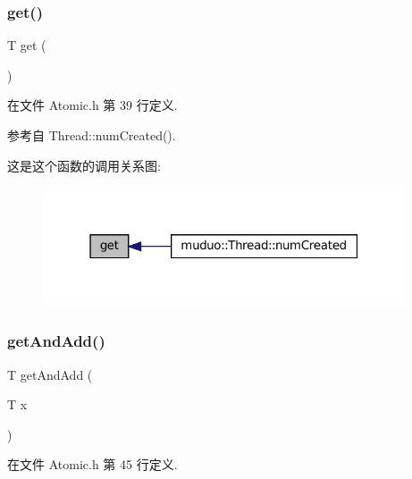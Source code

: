 \subsubsection{\texorpdfstring{get()}{get()}}
{\footnotesize\ttfamily T get (\begin{DoxyParamCaption}{ }\end{DoxyParamCaption})\hspace{0.3cm}{\ttfamily [inline]}}



在文件 Atomic.\+h 第 39 行定义.



参考自 Thread\+::num\+Created().

这是这个函数的调用关系图\+:
\nopagebreak
\begin{figure}[H]
\begin{center}
\leavevmode
\includegraphics[width=304pt]{classmuduo_1_1detail_1_1AtomicIntegerT_af6ea056c8af82f08af9fd0d857967f9b_icgraph}
\end{center}
\end{figure}
\mbox{\label{classmuduo_1_1detail_1_1AtomicIntegerT_acb0d3a5f2a930460bc3223b689fe8e8f}} 
\subsubsection{\texorpdfstring{get\+And\+Add()}{getAndAdd()}}
{\footnotesize\ttfamily T get\+And\+Add (\begin{DoxyParamCaption}\item[{T}]{x }\end{DoxyParamCaption})\hspace{0.3cm}{\ttfamily [inline]}}



在文件 Atomic.\+h 第 45 行定义.



